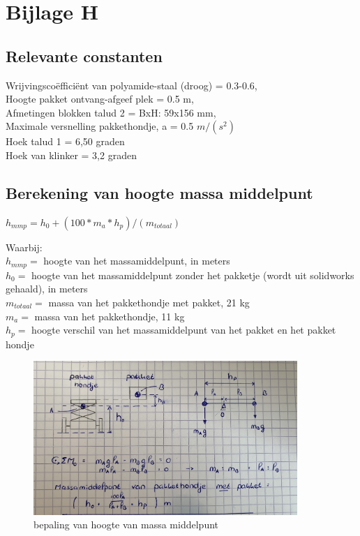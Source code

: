 \chapter{Bijlage H}
\label{ch:Bijlage_H_berekeningen}

\section{Relevante constanten}
\label{se:Bijlage_H_relevante_constanten}
\vspace{1 mm}

Wrijvingscoëfficiënt van polyamide-staal (droog) = 	0.3-0.6, \cite{wrijvingscoefficient_rolweerstand_luchtweerstand}\\ 
Hoogte pakket ontvang-afgeef plek = 0.5 m, \cite{beek_2020_opdracht}\\
Afmetingen blokken talud 2 = BxH: 59x156 mm, \cite{beek_2020_opdracht}\\
Maximale versnelling pakkethondje, a = 0.5 $m/(s^2)$\\
Hoek talud 1 = 6,50 graden\\
Hoek van klinker = 3,2 graden\\

\section{Berekening van hoogte massa middelpunt}
\label{se:Bijlage_H_mmp}
\vspace{1 mm}
$ h_{mmp} = h_{0} + (100*m_{a}*h_{p})/(m_{totaal}) $\\
\vspace{1 mm}
    
Waarbij:\\
$h_{mmp} =$ hoogte van het massamiddelpunt, in meters\\
$h_{0} =$ hoogte van het massamiddelpunt zonder het pakketje (wordt uit solidworks gehaald), in meters\\ 
$m_{totaal} =$ massa van het pakkethondje met pakket, 21 kg\\
$m_{a} =$ massa van het pakkethondje, 11 kg\\
$h_{p} =$ hoogte verschil van het massamiddelpunt van het pakket en het pakket hondje\\

    
\begin{figure}[H]
    \centering
    \includegraphics[width = 100mm]{06_Bijlage_H/Dynamische stabiliteit/h_mmp.jpg}
    \caption{bepaling van hoogte van massa middelpunt}
    \label{fig:mmp_h}
\end{figure}

